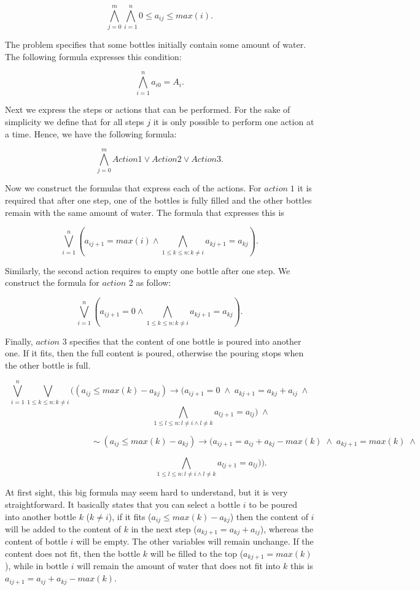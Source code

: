 \[\bigwedge_{j=0}^m \bigwedge_{i=1}^n 0 \leq a_{ij} \leq max(i).\]

The problem specifies that some bottles initially contain some amount of water. The following formula expresses this condition:

\[\bigwedge_{i=1}^n a_{i0} = A_{i}.\]

Next we express the steps or actions that can be performed. For the sake of simplicity we define that for all steps $j$ it is only possible to perform one action at a time. Hence, we have the following formula:

\[\bigwedge_{j=0}^m Action1 \vee Action2 \vee Action3.\]

Now we construct the formulas that express each of the actions. For $action \; 1$ it is required that after one step, one of the bottles is fully filled and the other bottles remain with the same amount of water. The formula that expresses this is

\[\bigvee_{i=1}^n (a_{ij+1} = max(i) \wedge \bigwedge_{1 \leq k \leq n: k \neq i} a_{kj+1} = a_{kj}).\]

Similarly, the second action requires to empty one bottle after one step. We construct the formula for $action$ 2 as follow:

\[\bigvee_{i=1}^n (a_{ij+1} = 0 \wedge \bigwedge_{1 \leq k \leq n: k \neq i} a_{kj+1} = a_{kj}).\]

Finally, $action$ 3 specifies that the content of one bottle is poured into another one. If it fits, then the full content is poured, otherwise the pouring stops when the other bottle is full.

\[\bigvee_{i=1}^n \bigvee_{1 \leq k \leq n: k \neq i} ((a_{ij} \leq max(k) - a_{kj}) \rightarrow (a_{ij+1}=0 \;\wedge\; a_{kj+1} = a_{kj} + a_{ij} \; \wedge\]
\[\qquad \qquad \qquad \qquad \qquad \qquad\bigwedge_{1 \leq l \leq n: l \neq i \wedge l \neq k} a_{lj+1} = a_{lj})\; \wedge \]

\[\qquad \qquad \qquad \qquad \qquad \sim(a_{ij} \leq max(k) - a_{kj}) \rightarrow (a_{ij+1}= a_{ij} + a_{kj} - max(k) \;\wedge\; a_{kj+1} = max(k) \;\wedge \]

\[\qquad \qquad \qquad \qquad \qquad \qquad\bigwedge_{1 \leq l \leq n: l \neq i \wedge l \neq k} a_{lj+1} = a_{lj})) .\]

At first sight, this big formula may seem hard to understand, but it is very straightforward. It basically states that you can select a bottle $i$ to be poured into another bottle $k$ ($k \neq i$), if it fits ($a_{ij} \leq max(k) - a_{kj}$) then the content of $i$ will be added to the content of $k$ in the next step ($a_{kj+1} = a_{kj} + a_{ij}$), whereas the content of bottle $i$ will be empty. The other variables will remain unchange. If the content does not fit, then the bottle $k$ will be filled to the top ($a_{kj+1} = max(k)$), while in bottle $i$ will remain the amount of water that does not fit into $k$ this is $a_{ij+1}= a_{ij} + a_{kj} - max(k)$.

